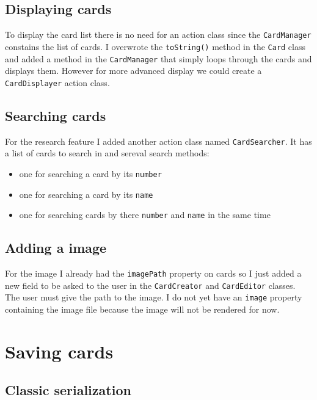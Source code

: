 \documentclass{article}
\begin{document}
\subsection{Displaying cards}

To display the card list there is no need for an action class since the
\texttt{CardManager} constains the list of cards. I overwrote the
\texttt{toString()} method in the \texttt{Card} class and added a method
in the \texttt{CardManager} that simply loops through the cards and
displays them. However for more advanced display we could create a
\texttt{CardDisplayer} action class.

\subsection{Searching cards}

For the research feature I added another action class named
\texttt{CardSearcher}. It has a list of cards to search in and sereval
search methods:

\begin{itemize}
\itemsep0pt\parskip0pt
\item one for searching a card by its \texttt{number}
\item one for searching a card by its \texttt{name}
\item one for searching cards by there \texttt{number} and \texttt{name} in the
same time
\end{itemize}

\subsection{Adding a image}

For the image I already had the \texttt{imagePath} property on cards so
I just added a new field to be asked to the user in the
\texttt{CardCreator} and \texttt{CardEditor} classes. The user must give
the path to the image. I do not yet have an \texttt{image} property
containing the image file because the image will not be rendered for
now.

\section{Saving cards}

\subsection{Classic serialization}
\end{document}
